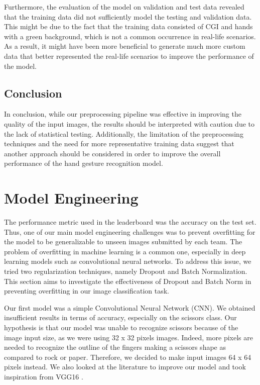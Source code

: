\documentclass[a4paper]{article}
\begin{document}
Furthermore, the evaluation of the model on validation and test data revealed that the training data did not sufficiently model the testing and validation data. This might be due to the fact that the training data consisted of CGI and hands with a green background, which is not a common occurrence in real-life scenarios. As a result, it might have been more beneficial to generate much more custom data that better represented the real-life scenarios to improve the performance of the model.

\subsection{Conclusion}

In conclusion, while our preprocessing pipeline was effective in improving the quality of the input images, the results should be interpreted with caution due to the lack of statistical testing. Additionally, the limitation of the preprocessing techniques and the need for more representative training data suggest that another approach should be considered in order to improve the overall performance of the hand gesture recognition model.



\section{Model Engineering} \label{sec:ModelEng}


The performance metric used in the leaderboard was the accuracy on the test set. Thus, one of our main model engineering challenges was to prevent overfitting for the model to be generalizable to unseen images submitted by each team.
The problem of overfitting in machine learning is a common one, especially in deep learning models such as convolutional neural networks. To address this issue, we tried two regularization techniques, namely Dropout and Batch Normalization.
This section aims to investigate the effectiveness of Dropout and Batch Norm in preventing overfitting in our image classification task. 


Our first model was a simple Convolutional Neural Network (CNN). We obtained insufficient results in terms of accuracy, especially on the scissors class. Our hypothesis is that our model was unable to recognize scissors because of the image input size, as we were using 32 x 32 pixels images. Indeed, more pixels are needed to recognize the outline of the fingers making a scissors shape as compared to rock or paper. Therefore, we decided to make input images 64 x 64 pixels instead. We also looked at the literature to improve our model and took inspiration from VGG16 \citep{VGG16}.
\end{document}
